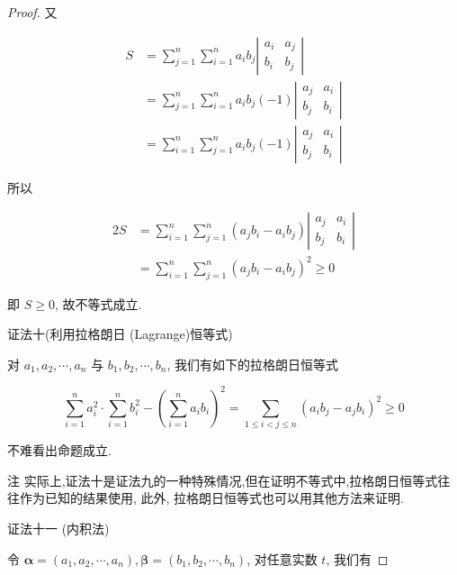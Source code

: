 \begin{proof}
	又
	
	$$
	\begin{aligned}
	S & =\sum_{j=1}^{n} \sum_{i=1}^{n} a_{i} b_{j}\left|\begin{array}{cc}
	a_{i} & a_{j} \\
	b_{i} & b_{j}
	\end{array}\right| \\
	& =\sum_{j=1}^{n} \sum_{i=1}^{n} a_{i} b_{j}(-1)\left|\begin{array}{cc}
	a_{j} & a_{i} \\
	b_{j} & b_{i}
	\end{array}\right| \\
	& =\sum_{i=1}^{n} \sum_{j=1}^{n} a_{i} b_{j}(-1)\left|\begin{array}{cc}
	a_{j} & a_{i} \\
	b_{j} & b_{i}
	\end{array}\right|
	\end{aligned}
	$$
	
	所以
	
	$$
	\begin{aligned}
	2 S & =\sum_{i=1}^{n} \sum_{j=1}^{n}\left(a_{j} b_{i}-a_{i} b_{j}\right)\left|\begin{array}{ll}
	a_{j} & a_{i} \\
	b_{j} & b_{i}
	\end{array}\right| \\
	& =\sum_{i=1}^{n} \sum_{j=1}^{n}\left(a_{j} b_{i}-a_{i} b_{j}\right)^{2} \geqslant 0
	\end{aligned}
	$$
	
	即 $S \geqslant 0$, 故不等式成立.
	
	证法十(利用拉格朗日 (Lagrange)恒等式)
	
	对 $a_{1}, a_{2}, \cdots, a_{n}$ 与 $b_{1}, b_{2}, \cdots, b_{n}$, 我们有如下的拉格朗日恒等式
	
	$$
	\sum_{i=1}^{n} a_{i}^{2} \cdot \sum_{i=1}^{n} b_{i}^{2}-\left(\sum_{i=1}^{n} a_{i} b_{i}\right)^{2}=\sum_{1 \leqslant i<j \leqslant n}\left(a_{i} b_{j}-a_{j} b_{i}\right)^{2} \geqslant 0
	$$
	
	不难看出命题成立.
	
	注 实际上,证法十是证法九的一种特殊情况,但在证明不等式中,拉格朗日恒等式往往作为已知的结果使用, 此外, 拉格朗日恒等式也可以用其他方法来证明.
	
	证法十一 (内积法)
	
	令 $\boldsymbol{\alpha}=\left(a_{1}, a_{2}, \cdots, a_{n}\right), \boldsymbol{\beta}=\left(b_{1}, b_{2}, \cdots, b_{n}\right)$, 对任意实数 $t$, 我们有
	

\end{proof}
